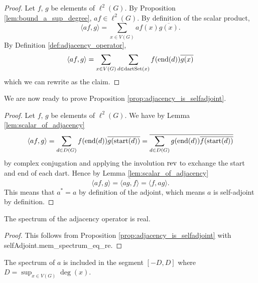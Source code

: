 \begin{proof}
  Let $f$, $g$ be elements of $\ell^2(G)$.
  By Proposition \ref{lem:bound_a_sup_degree}, $a f \in \ell^2(G)$.
  By definition of the scalar product,
  \begin{equation}
    \langle af, g \rangle
    = \sum_{x \in V(G)} af(x) \overline{g(x)}.
  \end{equation}
  By Definition \ref{def:adjacency_operator},
  \begin{equation}
    \langle af, g \rangle
    = \sum_{x \in V(G)}
    \sum_{d \in \mathrm{dartSet}(x)}
    f(\mathrm{end}(d)) \overline{g(x)}
  \end{equation}
  which we can rewrite as the claim.
\end{proof}

We are now ready to prove Proposition \ref{prop:adjacency_is_selfadjoint}.

\begin{proof}
  Let $f$, $g$ be elements of $\ell^2(G)$.
  We have by Lemma \ref{lem:scalar_of_adjacency}
  \begin{equation*}
    \langle af, g \rangle
    = \sum_{d \in D(G)}
    f(\mathrm{end}(d)) \overline{g(\mathrm{start}(d))}
    = \overline{\sum_{d \in D(G)}
    g(\mathrm{end}(d)) \overline{f(\mathrm{start}(d))}}
  \end{equation*}
  by complex conjugation and applying the involution $\mathrm{rev}$ to exchange the
  start and end of each dart.
  Hence by Lemma \ref{lem:scalar_of_adjacency}
  \begin{equation*}
    \langle af, g \rangle
    = \overline{\langle ag, f \rangle} = \langle f, ag \rangle.
  \end{equation*}
  This means that $a^*=a$ by definition of
  the adjoint, which means $a$ is self-adjoint by definition.
\end{proof}

\begin{corollary}
  \label{cor:spectrum_is_real}
  The spectrum of the adjacency operator is real.
\end{corollary}

\begin{proof}
  This follows from Proposition \ref{prop:adjacency_is_selfadjoint} with
  selfAdjoint.mem\_spectrum\_eq\_re.
\end{proof}

\begin{lemma}
  \label{lem:spectrum_in_segment}
  The spectrum of $a$ is included in the
  segment $[-D,D]$ where $D = \sup_{x \in V(G)} \deg(x)$.
\end{lemma}

